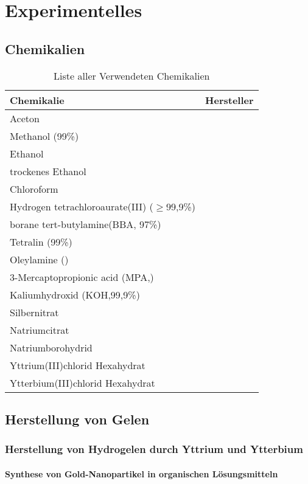\section{Experimentelles}
	\subsection{Chemikalien}
		\begin{table}[H]
			\centering
			\caption{Liste aller Verwendeten Chemikalien}
			\label{tab:Chemikalien}
			\begin{tabular}{ll}
				\toprule
				Chemikalie & Hersteller \\
				\midrule
				Aceton&\\
				Methanol (99\%)&\\
				Ethanol&\\
				trockenes Ethanol&\\
				Chloroform&\\
				Hydrogen tetrachloroaurate(III) ($\geq$99,9\%) & \\ 
				borane tert-butylamine(BBA, 97\%) &\\
				Tetralin (99\%)&\\
				Oleylamine ()&\\
				3-Mercaptopropionic acid (MPA,)&\\
				Kaliumhydroxid (KOH,99,9\%)&\\
				Silbernitrat&\\
				Natriumcitrat&\\
				Natriumborohydrid&\\
				Yttrium(III)chlorid Hexahydrat&\\
				Ytterbium(III)chlorid Hexahydrat&\\
				\bottomrule
			\end{tabular}
		\end{table}
	\subsection{Herstellung von Gelen}
	\subsubsection{Herstellung von Hydrogelen durch Yttrium und Ytterbium}
		
		\paragraph{Synthese von Gold-Nanopartikel in organischen Lösungsmitteln}
		
